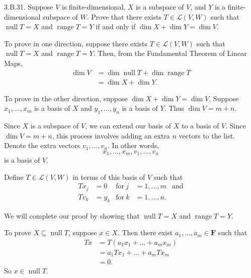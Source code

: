 \documentclass[a5paper]{article}
\begin{document}
\newcommand   \C           {\mathbf{C}}
\newcommand   \R           {\mathbf{R}}
\renewcommand \L           {\mathcal{L}}
\newcommand   \F           {\mathbf{F}}
\renewcommand \P           {\mathcal{P}}
\newcommand   \M           {\mathcal{M}}
\newcommand   \op          {\operatorname}

    3.B.31.
    Suppose $V$ is finite-dimensional, $X$ is a subspace of $V$, and $Y$ is a finite-dimensional subspace of $W$.
    Prove that there exists $T \in \L(V,W)$ such that $\op{null}T = X$ and $\op{range}T = Y$ if and only if $\op{dim}X + \op{dim}Y = \op{dim}V$.

    To prove in one direction, suppose there exists $T \in \L(V,W)$ such that $\op{null}T = X$ and $\op{range}T = Y$.
    Then, from the Fundamental Theorem of Linear Maps,
\begin{align*}
        \op{dim}V &= \op{dim}\op{null}T + \op{dim}\op{range}T \\
                  &= \op{dim}X + \op{dim}Y .
\end{align*}

    To prove in the other direction, suppose $\op{dim}X + \op{dim}Y = \op{dim}V$.
    Suppose $x_1,\dots,x_m$ is a basis of $X$ and $y_1,\dots,y_n$ is a basis of $Y$.
    Thus $\op{dim}V = m + n$.

    Since $X$ is a subspace of $V$, we can extend our basis of $X$ to a basis of $V$.
    Since $\op{dim}V = m + n$, this process involves adding an extra $n$ vectors to the list.
    Denote the extra vectors $v_1,\dots,v_n$.
    In other words,
\begin{equation*}
        x_1,\dots,x_m,v_1,\dots,v_n
\end{equation*}
    is a basis of $V$.

    Define $T \in \L(V,W)$ in terms of this basis of $V$ such that
\begin{align*}
        Tx_j&=0&    \text{for}\ j&=1,\dots,m&\text{and} \\
        Tv_k&=y_k&  \text{for}\ k&=1,\dots,n.&
\end{align*}

    We will complete our proof by showing that $\op{null}T = X$ and $\op{range}T = Y$.

    To prove $X \subseteq \op{null}T$, suppose $x \in X$.
    Then there exist $a_1,\dots,a_m \in \F$ such that 
\begin{align*}
        Tx &= T(a_1x_1 + \dots + a_mx_m) \\
           &= a_1Tx_1 + \dots + a_mTx_m  \\
           &= 0 .
\end{align*}
    So $x \in \op{null}T$.
\end{document}
